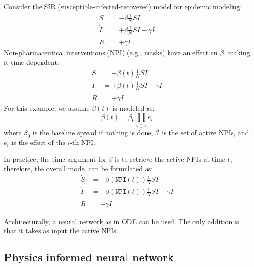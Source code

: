 \begin{description}
        \begin{example}
            Consider the SIR (susceptible-infected-recovered) model for epidemic modeling:
            \[
                \begin{split}
                    \dot{S} &= -\beta \frac{1}{N} SI \\
                    \dot{I} &= +\beta \frac{1}{N} SI - \gamma I \\
                    \dot{R} &= +\gamma I
                \end{split}
            \]
            Non-pharmaceutical interventions (NPI) (e.g., masks) have an effect on $\beta$, making it time dependent:
            \[
                \begin{split}
                    \dot{S} &= -\beta(t) \frac{1}{N} SI \\
                    \dot{I} &= +\beta(t) \frac{1}{N} SI - \gamma I \\
                    \dot{R} &= +\gamma I
                \end{split}
            \]
            For this example, we assume $\beta(t)$ is modeled as:
            \[ \beta(t) = \beta_0 \prod_{i \in \mathcal{I}} e_i \]
            where $\beta_0$ is the baseline spread if nothing is done, $\mathcal{I}$ is the set of active NPIs, and $e_i$ is the effect of the $i$-th NPI.

            In practice, the time argument for $\beta$ is to retrieve the active NPIs at time $t$, therefore, the overall model can be formulated as:
            \[
                \begin{split}
                    \dot{S} &= -\beta(\texttt{NPI}(t)) \frac{1}{N} SI \\
                    \dot{I} &= +\beta(\texttt{NPI}(t)) \frac{1}{N} SI - \gamma I \\
                    \dot{R} &= +\gamma I
                \end{split}
            \]

            Architecturally, a neural network as in ODE can be used. The only addition is that it takes as input the active NPIs.
        \end{example}
\end{description}


\subsection{Physics informed neural network}

